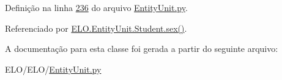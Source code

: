 Definição na linha \hyperlink{EntityUnit_8py_source_l00236}{236} do arquivo \hyperlink{EntityUnit_8py_source}{Entity\-Unit.\-py}.



Referenciado por \hyperlink{classELO_1_1EntityUnit_1_1Student_a358998b764eed85c81244ee43792f762}{E\-L\-O.\-Entity\-Unit.\-Student.\-sex()}.



A documentação para esta classe foi gerada a partir do seguinte arquivo\-:\begin{DoxyCompactItemize}
\item 
E\-L\-O/\-E\-L\-O/\hyperlink{EntityUnit_8py}{Entity\-Unit.\-py}\end{DoxyCompactItemize}
